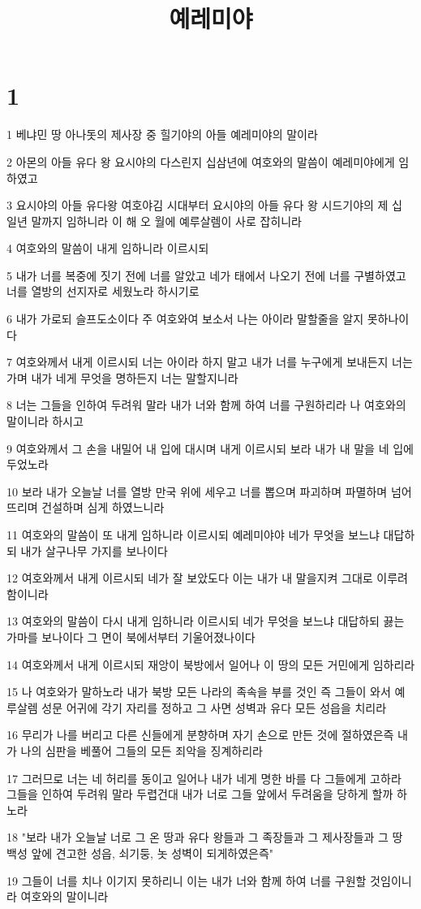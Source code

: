

\title{예레미야}


\chapter{1}

\par 1 베냐민 땅 아나돗의 제사장 중 힐기야의 아들 예레미야의 말이라
\par 2 아몬의 아들 유다 왕 요시야의 다스린지 십삼년에 여호와의 말씀이 예레미야에게 임하였고
\par 3 요시야의 아들 유다왕 여호야김 시대부터 요시야의 아들 유다 왕 시드기야의 제 십 일년 말까지 임하니라 이 해 오 월에 예루살렘이 사로 잡히니라
\par 4 여호와의 말씀이 내게 임하니라 이르시되
\par 5 내가 너를 복중에 짓기 전에 너를 알았고 네가 태에서 나오기 전에 너를 구별하였고 너를 열방의 선지자로 세웠노라 하시기로
\par 6 내가 가로되 슬프도소이다 주 여호와여 보소서 나는 아이라 말할줄을 알지 못하나이다
\par 7 여호와께서 내게 이르시되 너는 아이라 하지 말고 내가 너를 누구에게 보내든지 너는 가며 내가 네게 무엇을 명하든지 너는 말할지니라
\par 8 너는 그들을 인하여 두려워 말라 내가 너와 함께 하여 너를 구원하리라 나 여호와의 말이니라 하시고
\par 9 여호와께서 그 손을 내밀어 내 입에 대시며 내게 이르시되 보라 내가 내 말을 네 입에 두었노라
\par 10 보라 내가 오늘날 너를 열방 만국 위에 세우고 너를 뽑으며 파괴하며 파멸하며 넘어뜨리며 건설하며 심게 하였느니라
\par 11 여호와의 말씀이 또 내게 임하니라 이르시되 예레미야야 네가 무엇을 보느냐 대답하되 내가 살구나무 가지를 보나이다
\par 12 여호와께서 내게 이르시되 네가 잘 보았도다 이는 내가 내 말을지켜 그대로 이루려 함이니라
\par 13 여호와의 말씀이 다시 내게 임하니라 이르시되 네가 무엇을 보느냐 대답하되 끓는 가마를 보나이다 그 면이 북에서부터 기울어졌나이다
\par 14 여호와께서 내게 이르시되 재앙이 북방에서 일어나 이 땅의 모든 거민에게 임하리라
\par 15 나 여호와가 말하노라 내가 북방 모든 나라의 족속을 부를 것인 즉 그들이 와서 예루살렘 성문 어귀에 각기 자리를 정하고 그 사면 성벽과 유다 모든 성읍을 치리라
\par 16 무리가 나를 버리고 다른 신들에게 분향하며 자기 손으로 만든 것에 절하였은즉 내가 나의 심판을 베풀어 그들의 모든 죄악을 징계하리라
\par 17 그러므로 너는 네 허리를 동이고 일어나 내가 네게 명한 바를 다 그들에게 고하라 그들을 인하여 두려워 말라 두렵건대 내가 너로 그들 앞에서 두려움을 당하게 할까 하노라
\par 18 "보라 내가 오늘날 너로 그 온 땅과 유다 왕들과 그 족장들과 그 제사장들과 그 땅 백성 앞에 견고한 성읍, 쇠기둥, 놋 성벽이 되게하였은즉"
\par 19 그들이 너를 치나 이기지 못하리니 이는 내가 너와 함께 하여 너를 구원할 것임이니라 여호와의 말이니라

